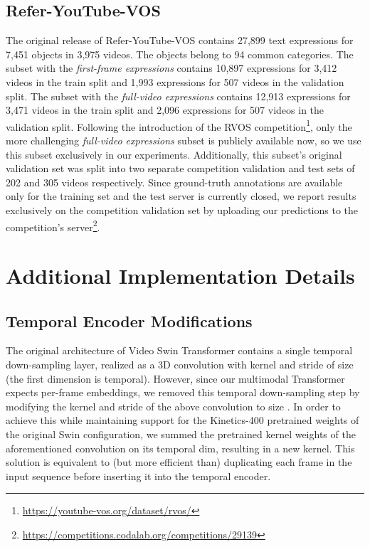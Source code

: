 \documentclass[10pt,twocolumn,letterpaper]{article}
\renewcommand{\cite}[1]{\citep{#1}}
\begin{document}
\subsection{Refer-YouTube-VOS}
\label{appendix_refer_youtube_vos}
The original release of Refer-YouTube-VOS \cite{seo2020urvos} contains 27,899 text expressions for 7,451 objects in 3,975 videos. The objects belong to 94 common categories. The subset with the \textit{first-frame expressions} contains 10,897 expressions for 3,412 videos in the train split and 1,993 expressions for 507 videos in the validation split. The subset with the \textit{full-video expressions} contains 12,913 expressions for 3,471 videos in the train split and 2,096 expressions for 507 videos in the validation split. Following the introduction of the RVOS competition\footnote{\url{https://youtube-vos.org/dataset/rvos/}}, only the more challenging \textit{full-video expressions} subset is publicly available now, so we use this subset exclusively in our experiments. Additionally, this subset's original validation set was split into two separate competition validation and test sets of 202 and 305 videos respectively. Since ground-truth annotations are available only for the training set and the test server is currently closed, we report results exclusively on the competition validation set by uploading our predictions to the competition’s server\footnote{\url{https://competitions.codalab.org/competitions/29139}}.


\section{Additional Implementation Details}
\label{supp_additional_imp_det}
\subsection{Temporal Encoder Modifications}
\label{supp_temporal_encoder}
The original architecture of Video Swin Transformer \cite{liu2021vswin} contains a single temporal down-sampling layer, realized as a 3D convolution with kernel and stride of size  (the first dimension is temporal). However, since our multimodal Transformer expects per-frame embeddings, we removed this temporal down-sampling step by modifying the kernel and stride of the above convolution to size . In order to achieve this while maintaining support for the Kinetics-400 \cite{kay2017kinetics} pretrained weights of the original Swin configuration, we summed the pretrained kernel weights of the aforementioned convolution on its temporal dim, resulting in a new  kernel. This solution is equivalent to (but more efficient than) duplicating each frame in the input sequence before inserting it into the temporal encoder.
\end{document}
